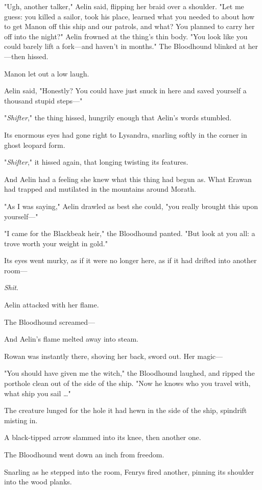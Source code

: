 "Ugh, another talker," Aelin said, flipping her braid over a shoulder.
"Let me guess: you killed a sailor, took his place, learned what you needed to about how to get Manon off this ship and our patrols, and  what?
You planned to carry her off into the night?"
Aelin frowned at the thing's thin body.
"You look like you could barely lift a fork---and haven't in months."
The Bloodhound blinked at her---then hissed.

Manon let out a low laugh.

Aelin said, "Honestly?
You could have just snuck in here and saved yourself a thousand stupid steps---"

"\emph{Shifter}," the thing hissed, hungrily enough that Aelin's words stumbled.

Its enormous eyes had gone right to Lysandra, snarling softly in the corner in ghost leopard form.

"\emph{Shifter}," it hissed again, that longing twisting its features.

And Aelin had a feeling she knew what this thing had begun as.
What Erawan had trapped and mutilated in the mountains around Morath.

"As I was saying," Aelin drawled as best she could, "you really brought this upon yourself---"

"I came for the Blackbeak heir," the Bloodhound panted.
"But look at you all: a trove worth your weight in gold."

Its eyes went murky, as if it were no longer here, as if it had drifted into another room---

\emph{Shit}.

Aelin attacked with her flame.

The Bloodhound screamed---

And Aelin's flame melted away into steam.

Rowan was instantly there, shoving her back, sword out.
Her magic---

"You should have given me the witch," the Bloodhound laughed, and ripped the porthole clean out of the side of the ship.
"Now he knows who you travel with, what ship you sail \ldots"

The creature lunged for the hole it had hewn in the side of the ship, spindrift misting in.

A black-tipped arrow slammed into its knee, then another one.

The Bloodhound went down an inch from freedom.

Snarling as he stepped into the room, Fenrys fired another, pinning its shoulder into the wood planks.

